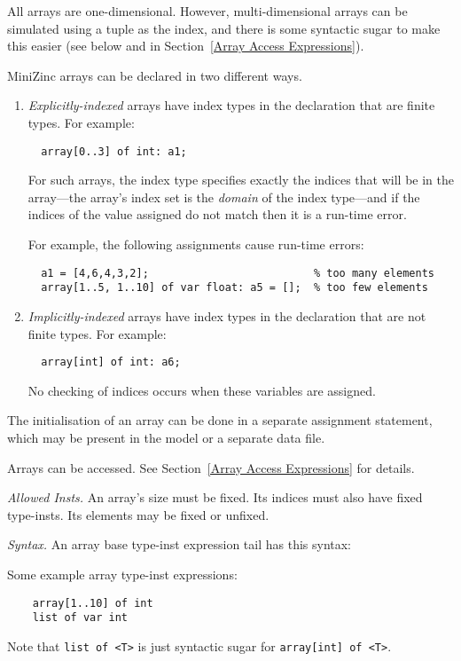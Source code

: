 \documentclass[10pt]{scrartcl}
\newcommand{\TyThing}[1]{\vspace{1.2mm}\noindent\emph{#1} }
\newcommand{\TyInsts}{\TyThing{Allowed Insts.}}
\newcommand{\TySyntax}{\TyThing{Syntax.}}
\begin{document}
All arrays are one-dimensional.  
However, multi-dimensional arrays can be
simulated using a tuple as the index, and there is some syntactic sugar to
make this easier (see below and in Section~\ref{Array Access Expressions}).

MiniZinc arrays can be declared in two different ways.
\begin{enumerate}
\item
    \emph{Explicitly-indexed} arrays have index types in the declaration
    that are finite types.  For example:
\begin{verbatim}
  array[0..3] of int: a1;
\end{verbatim}
    For such arrays, the index type specifies exactly the indices that will
    be in the array---the array's index set is the \emph{domain} of the
    index type---and if the indices of the value assigned do not match then
    it is a run-time error.

    For example, the following assignments cause run-time errors:
\begin{verbatim}
  a1 = [4,6,4,3,2];                          % too many elements
  array[1..5, 1..10] of var float: a5 = [];  % too few elements
\end{verbatim}

\item
    \emph{Implicitly-indexed} arrays have index types in the declaration
    that are not finite types.  For example:
\begin{verbatim}
  array[int] of int: a6;
\end{verbatim}
    No checking of indices occurs when these variables are assigned.
\end{enumerate}

The initialisation of an array can be done in a separate assignment
statement, which may be present in the model or a separate data file.

Arrays can be accessed.  See Section~\ref{Array Access Expressions} for
details.

\TyInsts
An array's size must be fixed.  Its indices must also have
fixed type-insts.  Its elements may be fixed or unfixed.

\TySyntax
An array base type-inst expression tail has this syntax:
\begin{productions}
    \RuleArrayTIExprTail
\end{productions}
Some example array type-inst expressions:
\begin{verbatim}
    array[1..10] of int
    list of var int
\end{verbatim}
Note that \texttt{list of <T>} is just syntactic sugar for
\texttt{array[int] of <T>}.  
\end{document}
